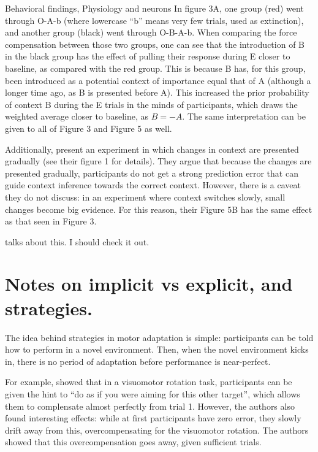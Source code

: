 \documentclass{report}
\begin{document}
\begin{chapter}{Behavioral findings, Physiology and neurons}
In figure 3A, one group (red) went through O-A-b (where lowercase ``b'' means
very few trials, used as extinction), and another group (black) went through
O-B-A-b. When comparing the force compensation between those two groups, one
can see that the introduction of B in the black group has the effect of pulling
their response during E closer to baseline, as compared with the red
group. This is because B has, for this group, been introduced as a potential
context of importance equal that of A (although a longer time ago, as B is
presented before A). This increased the prior probability of context B during
the E trials in the minds of participants, which draws the weighted average
closer to baseline, as $B = -A$. The same interpretation can be given to all of
Figure 3 and Figure 5 as well.

Additionally, \cite{Pekny_Protection_2011} present an experiment in which
changes in context are presented gradually (see their figure 1 for
details). They argue that because the changes are presented gradually,
participants do not get a strong prediction error that can guide context
inference towards the correct context. However, there is a caveat they do not
discuss: in an experiment where context switches slowly, small changes become
big evidence. For this reason, their Figure 5B has the same effect as that seen
in Figure 3.

\cite{Pekny_Protection_2011} talks about this. I should check it out.


\section{Notes on implicit vs explicit, and strategies.}
The idea behind strategies in motor adaptation is simple: participants can be
told how to perform in a novel environment. Then, when the novel environment
kicks in, there is no period of adaptation before performance is near-perfect.

For example, \cite{Taylor_Flexible_2011,Mazzoni_Implicit_2006} showed that in a
visuomotor rotation task, participants can be given the hint to ``do as if you
were aiming for this other target'', which allows them to complensate almost
perfectly from trial 1. However, the authors also found interesting effects:
while at first participants have zero error, they slowly drift away from this,
overcompensating for the visuomotor rotation. The authors showed that this
overcompensation goes away, given sufficient trials.


\end{chapter}
\end{document}

